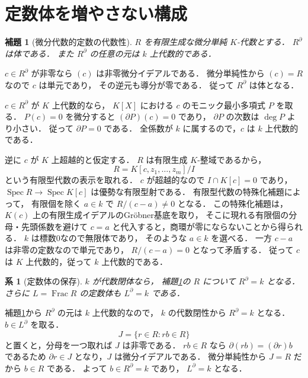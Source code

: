 \documentclass[a5paper,10pt,onecolumn]{jsarticle}
\makeatletter
\theoremstyle{mathnotetheorem}
\newtheorem{lemma}[theorem]{補題}
\newtheorem{corollary}[theorem]{系}
\renewcommand{\proofname}{証明}
\renewenvironment{proof}[1][\proofname]{%
  \par\pushQED{\qed}\normalfont\topsep4\p@\@plus2\p@\relax
  \trivlist\item[\hskip\labelsep\bfseries #1]\ignorespaces
}{\popQED\endtrivlist\@endpefalse}
\makeatother
\begin{document}
\section{定数体を増やさない構成}

\begin{lemma}[微分代数的定数の代数性]\label{lem:alg-constants}
$R$ を有限生成な微分単純 $K$-代数とする．
$R^\partial$ は体である．
また $R^\partial$ の任意の元は $k$ 上代数的である．
\end{lemma}
\begin{proof}
$c\in R^\partial$ が非零なら
$(c)$ は非零微分イデアルである．
微分単純性から $(c)=R$ なので $c$ は単元であり，
その逆元も導分が零である．
従って $R^\partial$ は体となる．

$c\in R^\partial$ が $K$ 上代数的なら，
$K[X]$ における $c$ のモニック最小多項式 $P$ を取る．
$P(c)=0$ を微分すると
$(\partial P)(c)=0$ であり，
$\partial P$ の次数は $\deg P$ より小さい．
従って $\partial P=0$ である．
全係数が $k$ に属するので，$c$ は $k$ 上代数的である．

逆に $c$ が $K$ 上超越的と仮定する．
$R$ は有限生成 $K$-整域であるから，
\[
 R=K[c,z_1,\dots,z_m]/I
\]
という有限型代数の表示を取れる．
$c$ が超越的なので $I\cap K[c]=0$ であり，
$\operatorname{Spec}R\to\operatorname{Spec}K[c]$
は優勢な有限型射である．
有限型代数の特殊化補題によって，
有限個を除く $a\in k$ で
$R/(c-a)\ne0$ となる．
この特殊化補題は，
$K(c)$ 上の有限生成イデアルのGr\"obner基底を取り，
そこに現れる有限個の分母・先頭係数を避けて
$c=a$ と代入すると，商環が零にならないことから得られる．
$k$ は標数0なので無限体であり，
そのような $a\in k$ を選べる．
一方 $c-a$ は非零の定数なので単元であり，
$R/(c-a)=0$ となって矛盾する．
従って $c$ は $K$ 上代数的，従って $k$ 上代数的である．
\end{proof}

\begin{corollary}[定数体の保存]\label{cor:constants}
$k$ が代数閉体なら，
補題\ref{lem:alg-constants}の $R$ について
$R^\partial=k$ となる．
さらに $L=\operatorname{Frac}R$ の定数体も
$L^\partial=k$ である．
\end{corollary}
\begin{proof}
補題\ref{lem:alg-constants}から
$R^\partial$ の元は $k$ 上代数的なので，
$k$ の代数閉性から $R^\partial=k$ となる．
$b\in L^\partial$ を取る．
\[
 J=\{r\in R:rb\in R\}
\]
と置くと，分母を一つ取れば $J$ は非零である．
$rb\in R$ なら
$\partial(rb)=(\partial r)b$ であるため
$\partial r\in J$ となり，$J$ は微分イデアルである．
微分単純性から $J=R$ だから $b\in R$ である．
よって $b\in R^\partial=k$ であり，
$L^\partial=k$ となる．
\end{proof}
\end{document}

